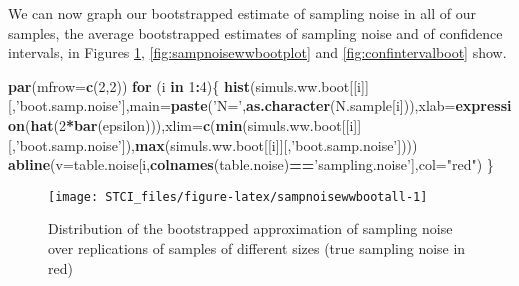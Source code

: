 \documentclass[]{book}
\newenvironment{Shaded}{\begin{snugshade}}{\end{snugshade}}
\newcommand{\ControlFlowTok}[1]{\textcolor[rgb]{0.13,0.29,0.53}{\textbf{#1}}}
\newcommand{\DataTypeTok}[1]{\textcolor[rgb]{0.13,0.29,0.53}{#1}}
\newcommand{\DecValTok}[1]{\textcolor[rgb]{0.00,0.00,0.81}{#1}}
\newcommand{\KeywordTok}[1]{\textcolor[rgb]{0.13,0.29,0.53}{\textbf{#1}}}
\newcommand{\NormalTok}[1]{#1}
\newcommand{\OperatorTok}[1]{\textcolor[rgb]{0.81,0.36,0.00}{\textbf{#1}}}
\newcommand{\StringTok}[1]{\textcolor[rgb]{0.31,0.60,0.02}{#1}}
\theoremstyle{definition}
\theoremstyle{definition}
\theoremstyle{definition}
\theoremstyle{remark}
\begin{document}
We can now graph our bootstrapped estimate of sampling noise in all of our samples, the average bootstrapped estimates of sampling noise and of confidence intervals, in Figures \ref{fig:sampnoisewwbootall}, \ref{fig:sampnoisewwbootplot} and \ref{fig:confintervalboot} show.

\begin{Shaded}
\begin{Highlighting}[]
\KeywordTok{par}\NormalTok{(}\DataTypeTok{mfrow=}\KeywordTok{c}\NormalTok{(}\DecValTok{2}\NormalTok{,}\DecValTok{2}\NormalTok{))}
\ControlFlowTok{for}\NormalTok{ (i }\ControlFlowTok{in} \DecValTok{1}\OperatorTok{:}\DecValTok{4}\NormalTok{)\{}
  \KeywordTok{hist}\NormalTok{(simuls.ww.boot[[i]][,}\StringTok{'boot.samp.noise'}\NormalTok{],}\DataTypeTok{main=}\KeywordTok{paste}\NormalTok{(}\StringTok{'N='}\NormalTok{,}\KeywordTok{as.character}\NormalTok{(N.sample[i])),}\DataTypeTok{xlab=}\KeywordTok{expression}\NormalTok{(}\KeywordTok{hat}\NormalTok{(}\DecValTok{2}\OperatorTok{*}\KeywordTok{bar}\NormalTok{(epsilon))),}\DataTypeTok{xlim=}\KeywordTok{c}\NormalTok{(}\KeywordTok{min}\NormalTok{(simuls.ww.boot[[i]][,}\StringTok{'boot.samp.noise'}\NormalTok{]),}\KeywordTok{max}\NormalTok{(simuls.ww.boot[[i]][,}\StringTok{'boot.samp.noise'}\NormalTok{])))}
  \KeywordTok{abline}\NormalTok{(}\DataTypeTok{v=}\NormalTok{table.noise[i,}\KeywordTok{colnames}\NormalTok{(table.noise)}\OperatorTok{==}\StringTok{'sampling.noise'}\NormalTok{],}\DataTypeTok{col=}\StringTok{"red"}\NormalTok{)}
\NormalTok{\}}
\end{Highlighting}
\end{Shaded}

\begin{figure}[htbp]

{\centering \texttt{[image: STCI\_files/figure-latex/sampnoisewwbootall-1]} 

}

\caption{Distribution of the bootstrapped approximation of sampling noise over replications of samples of different sizes (true sampling noise in red)}\label{fig:sampnoisewwbootall}
\end{figure}
\end{document}
